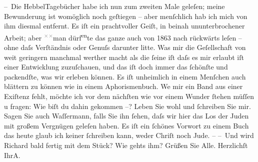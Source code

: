 \begin{ledgroupsized}[t]{13cm}
           \pstart
           – Die HebbelTagebücher habe ich nun zum zweiten Male geleſen;
               meine Bewunderung ist womöglich noch geſtiegen – aber menſchlich hab ich mich von ihm
               diesmal entfernt. Es iſt ein prachtvoller Geiſt, in beinah ununterbrochener Arbeit;
               aber \substVorne{}\textsuperscript{\textcolor{gray}{×}\-\textcolor{gray}{×}}\substDazwischen{}man\substHinten{} dürf\substVorne{}\textsuperscript{en}\substDazwischen{}te\substHinten{} das ganze auch von 1863 nach rückwärts leſen – ohne daſs
               Verſtändnis {\pb}oder Genuſs darunter litte. Was mir die
               Geſellschaft von weit geringern \introOben{}manchmal\introOben{} werther macht als
               die ſeine iſt daſs es mir erlaubt iſt einer Entwicklung zuzuſchauen, und das iſt doch
               immer das ſchönſte und packendſte, was wir erleben können. Es iſt unheimlich in einem
               Menſchen auch blättern zu können wie in einem Aphorismenbuch. We{\geminationn} mir ein Band aus einer Exiſtenz fehlt, möchte ich vor
                  {\pb}dem nächſten wie vor einem Wunder ſtehen müſſen u
               fragen: Wie biſt du dahin gekommen –?\pend
           \pstart
           Leben Sie wohl und ſchreiben Sie mir.\pend
           \pstart
           Sagen Sie auch Waſſermann, falls Sie ihn ſehen,
               daſs wir hier das Los der Juden mit großem
               Vergnügen geleſen haben. Es iſt ein ſchönes Vorwort zu einem Buch das heute glaub ich
               keiner ſchreiben kann, weder Chriſt noch Jude. –\pend
           \pstart
           – Und wird Richard bald {\pb}fertig mit dem Stück? Wie gehts ihm?\pend
           \pstart
            Grüßen Sie Alle.\pend
           \pstart Herzlichſt Ihr\spacefill\mbox{A.}\pend{}
         
         \endnumbering{}\end{ledgroupsized}  \newcommand{\dateiname}{L01424}\newcommand{\titel}{Arthur Schnitzler an Hugo von Hofmannsthal, 9. 8. 1904}\newcommand{\editorInnen}{ Martin Anton Müller und Gerd-Hermann Susen}
      